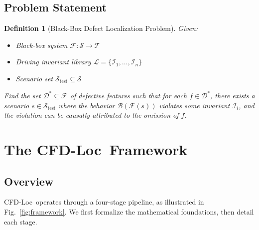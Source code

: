 \documentclass[conference]{IEEEtran}
\theoremstyle{plain}
\newtheorem{definition}{Definition}[section]
\newcommand{\methodname}{CFD-Loc}
\newcommand{\invlib}{\mathcal{L}}
\newcommand{\scenario}{\mathcal{S}}
\newcommand{\traj}{\mathcal{T}}
\newcommand{\sys}{\mathcal{F}}
\newcommand{\beh}{\mathcal{B}}
\begin{document}
\subsection{Problem Statement}

\begin{definition}[Black-Box Defect Localization Problem]\label{def:problem}
Given:
\begin{itemize}[nosep]
    \item Black-box system $\sys: \scenario \rightarrow \traj$
    \item Driving invariant library $\invlib = \{\mathcal{I}_1, \ldots, \mathcal{I}_n\}$
    \item Scenario set $\mathcal{S}_{\text{test}} \subseteq \scenario$
\end{itemize}
Find the set $\mathcal{D}^* \subseteq \mathcal{F}$ of defective features such that for each $f \in \mathcal{D}^*$, there exists a scenario $s \in \mathcal{S}_{\text{test}}$ where the behavior $\beh(\sys(s))$ violates some invariant $\mathcal{I}_i$, and the violation can be causally attributed to the omission of $f$.
\end{definition}

\section{The \methodname\ Framework}
\label{sec:method}

\subsection{Overview}

\methodname\ operates through a four-stage pipeline, as illustrated in Fig.~\ref{fig:framework}. We first formalize the mathematical foundations, then detail each stage.
\end{document}
